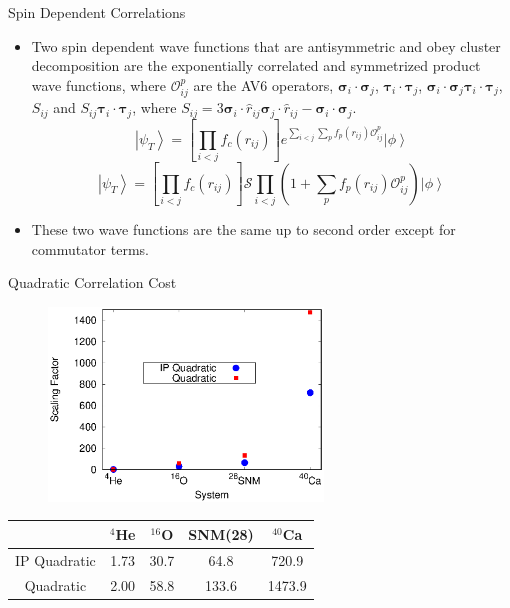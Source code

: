 \documentclass{beamer}
\newcommand{\ket}[1]{\left| #1 \right>}
\newcommand{\fpij}{f_p(r_{ij})}
\newcommand{\Opij}{\mathcal{O}_{ij}^p}
\newcommand{\ti}{\bm{\tau}_i}
\newcommand{\tj}{\bm{\tau}_j}
\newcommand{\si}{\bm{\sigma}_i}
\newcommand{\sj}{\bm{\sigma}_j}
\begin{document}
\begin{frame}{Spin Dependent Correlations}
\begin{itemize}
   \item Two spin dependent wave functions that are antisymmetric and obey cluster decomposition are the exponentially correlated and symmetrized product wave functions, where $\Opij$ are the AV6 operators, $\si\cdot\sj$, $\ti\cdot\tj$,     $\si\cdot\sj \ti\cdot\tj$, $S_{ij}$ and $S_{ij} \ti\cdot\tj$, where $S_{ij}     = 3\si\cdot\hat{r}_{ij}\sj\cdot\hat{r}_{ij}-\si\cdot\sj$.
   \begin{equation*}
      \ket{\psi_T} = \left[\prod\limits_{i<j}f_c(r_{ij})\right] e^{\sum\limits_{i<j}\sum\limits_p\fpij\Opij} \ket{\phi}
   \end{equation*}
   \begin{equation*}
      \ket{\psi_T} = \left[\prod\limits_{i<j}f_c(r_{ij})\right] \mathcal{S}\prod\limits_{i<j}\left(1+\sum\limits_p\fpij\Opij\right) \ket{\phi}
   \end{equation*}
   \item These two wave functions are the same up to second order except for  commutator terms.
\end{itemize}
\end{frame}

\begin{frame}{Quadratic Correlation Cost}
\begin{figure}[h]
   \centering
   \includegraphics[width=0.65\textwidth]{scaling.eps}
\end{figure}
\vspace{-0.2cm}
\begin{table}[h!]
   \centering
   \begin{tabular}{ccccc}
      \hline \hline
       & $^{4}$He & $^{16}$O & SNM(28) & $^{40}$Ca \\
      \hline
      IP Quadratic & 1.73 & 30.7 & 64.8 & 720.9 \\
      Quadratic & 2.00 & 58.8 & 133.6 & 1473.9 \\
      \hline \hline
   \end{tabular}
\end{table}
\end{frame}
\end{document}
